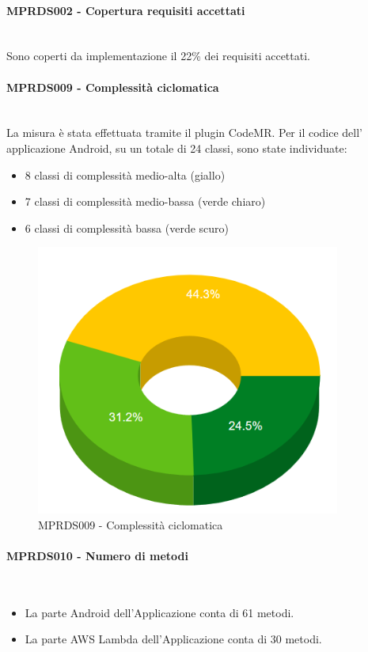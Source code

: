 \paragraph{MPRDS002 - Copertura requisiti accettati}\mbox{}\\[0.4cm]
Sono coperti da implementazione il 22\% dei requisiti accettati.
\paragraph{MPRDS009 - Complessità ciclomatica}\mbox{}\\[0.4cm]
La misura è stata effettuata tramite il plugin CodeMR. Per il codice dell' applicazione Android, su un totale di 24 classi, sono state individuate: \begin{itemize}
\item 8 classi di complessità medio-alta (giallo)
\item 7 classi di complessità medio-bassa (verde chiaro) 
\item 6 classi di complessità bassa (verde scuro) 
\end{itemize}
\begin{figure}[H]
	\centering
	\includegraphics[width=10cm,keepaspectratio]{../includes/pics/complexity.PNG}
	\caption{\label{fig:mission}MPRDS009 - Complessità ciclomatica}
\end{figure}
\paragraph{MPRDS010 - Numero di metodi}\mbox{}\\[0.4cm]
\begin{itemize}
\item La parte Android dell'Applicazione conta di 61 metodi.
\item La parte AWS Lambda dell'Applicazione conta di 30 metodi.
\end{itemize}

